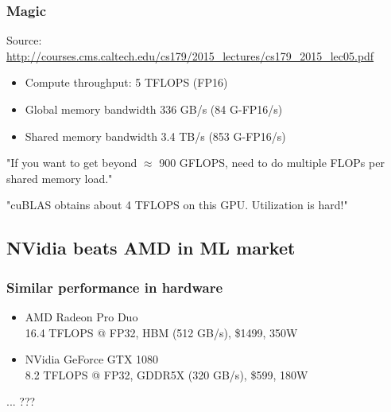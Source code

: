 \documentclass{beamer}
\begin{document}
            \begin{frame}
                \frametitle{Magic}
                    Source:\\
                    \url{http://courses.cms.caltech.edu/cs179/2015_lectures/cs179_2015_lec05.pdf}
                    \begin{itemize}
                        \item Compute throughput: 5 TFLOPS (FP16)
                        \item Global memory bandwidth 336 GB/s (84 G-FP16/s)
                        \item Shared memory bandwidth 3.4 TB/s (853 G-FP16/s)
                    \end{itemize}
                    
                    \begin{exampleblock}{}
                        {\large "If you want to get beyond $\approx$ 900 GFLOPS, need to do multiple FLOPs per shared memory load."}
                    \end{exampleblock}
                    
                    \begin{exampleblock}{}
                        {\large "cuBLAS obtains about 4 TFLOPS on this GPU. Utilization is hard!"}
                    \end{exampleblock}
            \end{frame}

		\subsection{NVidia beats AMD in ML market}

			\begin{frame}
				\frametitle{Similar performance in hardware}
				\begin{itemize} 
					\item AMD Radeon Pro Duo\\
						16.4 TFLOPS @ FP32, HBM (512 GB/s), \$1499, 350W
					\item NVidia GeForce GTX 1080\\
						8.2 TFLOPS @ FP32, GDDR5X (320 GB/s), \$599, 180W
				\end{itemize} 
				\vspace{\baselineskip}
				... ???
			\end{frame}
			
\end{document}
